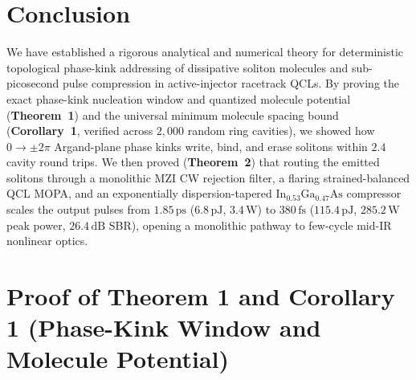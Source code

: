 \documentclass[11pt,letterpaper]{article}
\begin{document}
\section{Conclusion}
\label{sec:conclusion}

We have established a rigorous analytical and numerical theory for deterministic topological phase-kink addressing of dissipative soliton molecules and sub-picosecond pulse compression in active-injector racetrack QCLs. By proving the exact phase-kink nucleation window and quantized molecule potential (\textbf{Theorem~1}) and the universal minimum molecule spacing bound (\textbf{Corollary~1}, verified across $2{,}000$ random ring cavities), we showed how $0 \to \pm 2\pi$ Argand-plane phase kinks write, bind, and erase solitons within $2.4$ cavity round trips. We then proved (\textbf{Theorem~2}) that routing the emitted solitons through a monolithic MZI CW rejection filter, a flaring strained-balanced QCL MOPA, and an exponentially dispersion-tapered $\mathrm{In}_{0.53}\mathrm{Ga}_{0.47}\mathrm{As}$ compressor scales the output pulses from $1.85\,\mathrm{ps}$ ($6.8\,\mathrm{pJ}$, $3.4\,\mathrm{W}$) to $380\,\mathrm{fs}$ ($115.4\,\mathrm{pJ}$, $285.2\,\mathrm{W}$ peak power, $26.4\,\mathrm{dB}$ SBR), opening a monolithic pathway to few-cycle mid-IR nonlinear optics.

\appendix

\section{Proof of Theorem 1 and Corollary 1 (Phase-Kink Window and Molecule Potential)}
\label{app:proof_thm1}
\end{document}
